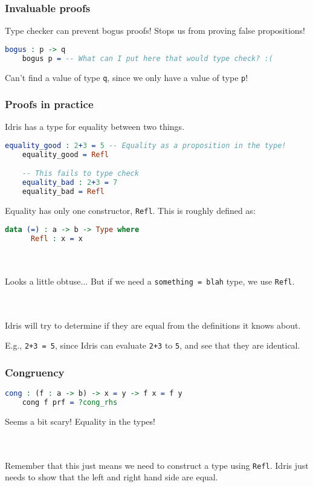 \documentclass{beamer}
\begin{document}
\begin{frame}[fragile]
  \frametitle{Invaluable proofs}

  Type checker can prevent bogus proofs! Stops us from proving false propositions!

  \pause
  \begin{lstlisting}[language=Idris]
    bogus : p -> q
    bogus p = -- What can I put here that would type check? :(
  \end{lstlisting}

  \pause
  Can't find a value of type \texttt{q}, since we only have a value of type \texttt{p}!
\end{frame}

\begin{frame}[fragile]
  \frametitle{Proofs in practice}

  Idris has a type for equality between two things.

  \pause
  \begin{lstlisting}[language=Idris]
    equality_good : 2+3 = 5 -- Equality as a proposition in the type!
    equality_good = Refl

    -- This fails to type check
    equality_bad : 2+3 = 7
    equality_bad = Refl
  \end{lstlisting}

  \pause
  Equality has only one constructor, \texttt{Refl}. This is roughly defined as:

  \pause
  \begin{lstlisting}[language=Idris]
    data (=) : a -> b -> Type where
      Refl : x = x
  \end{lstlisting}

  \pause \\~\\

  Looks a little obtuse... But if we need a \texttt{something = blah} type, we use \texttt{Refl}.

  \pause \\~\\

  Idris will try to determine if they are equal from the definitions it knows about.

  \pause
  E.g., \texttt{2+3 = 5}, since Idris can evaluate \texttt{2+3} to \texttt{5}, and see that they are identical.
\end{frame}

\begin{frame}[fragile]
  \frametitle{Congruency}

  \begin{lstlisting}[language=Idris]
    cong : (f : a -> b) -> x = y -> f x = f y
    cong f prf = ?cong_rhs
  \end{lstlisting}

  \pause
  Seems a bit scary! Equality in the types!

  \pause \\~\\
  Remember that this just means we need to construct a type using
  \texttt{Refl}. Idris just needs to show that the left and right hand
  side are equal.
\end{frame}
\end{document}
